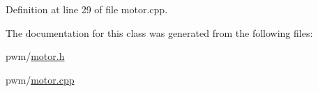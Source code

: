 \-Definition at line 29 of file motor.\-cpp.



\-The documentation for this class was generated from the following files\-:\begin{DoxyCompactItemize}
\item 
pwm/\hyperlink{motor_8h}{motor.\-h}\item 
pwm/\hyperlink{motor_8cpp}{motor.\-cpp}\end{DoxyCompactItemize}
